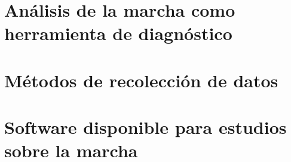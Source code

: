 \section[Herramient de diagnóstico]{Análisis de la marcha como herramienta de diagnóstico}

\section[Métodos de recolección]{Métodos de recolección de datos}

\section[Software disponible]{Software disponible para estudios sobre la marcha}

